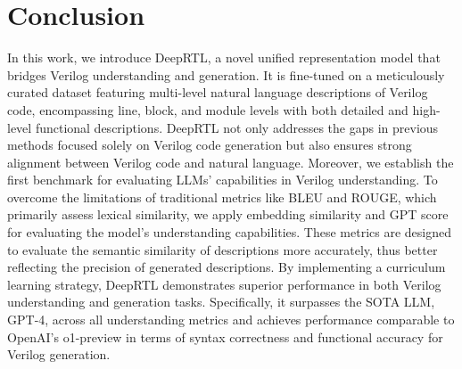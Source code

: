 \section{Conclusion}

In this work, we introduce DeepRTL, a novel unified representation model that bridges Verilog understanding and generation. 
It is fine-tuned on a meticulously curated dataset featuring multi-level natural language descriptions of Verilog code, encompassing line, block, and module levels with both detailed and high-level functional descriptions.
DeepRTL not only addresses the gaps in previous methods focused solely on Verilog code generation but also ensures strong alignment between Verilog code and natural language. 
Moreover, we establish the first benchmark for evaluating LLMs' capabilities in Verilog understanding. To overcome the limitations of traditional metrics like BLEU and ROUGE, which primarily assess lexical similarity, 
we apply embedding similarity and GPT score for evaluating the model's understanding capabilities.
These metrics are designed to evaluate the semantic similarity of descriptions more accurately, thus better reflecting the precision of generated descriptions. 
By implementing a curriculum learning strategy, DeepRTL demonstrates superior performance in both Verilog understanding and generation tasks. Specifically, it surpasses the SOTA LLM, GPT-4, across all understanding metrics and achieves performance comparable to OpenAI's o1-preview in terms of syntax correctness and functional accuracy for Verilog generation.